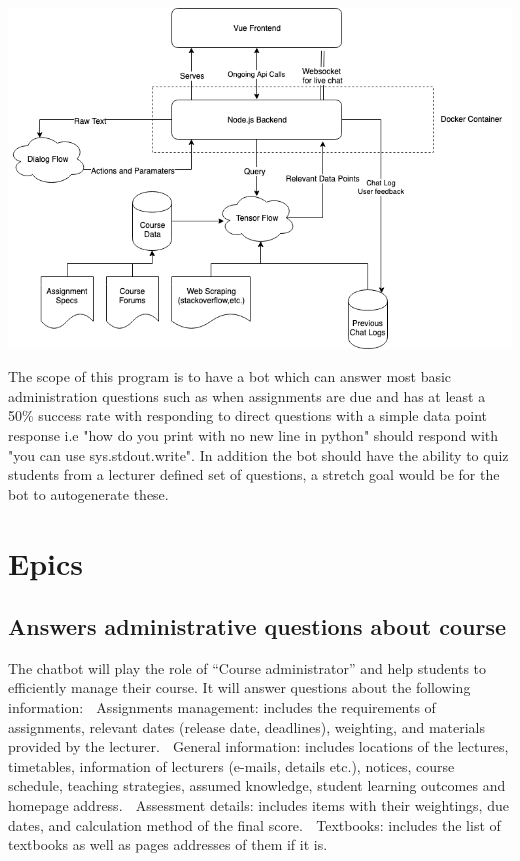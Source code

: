 \documentclass{article}
\begin{document}
\includegraphics[width=\textwidth]{architecture_diagram.png}

The scope of this program is to have a bot which can answer most basic administration questions such as when assignments are due and has at least a 50\% success rate with responding to direct questions with a simple data point response i.e 
"how do you print with no new line in python" should respond with "you can use sys.stdout.write". In addition the bot should have the ability to quiz students from a lecturer defined set of questions, a stretch goal would be for the bot to autogenerate these.

\section{Epics}
\subsection{Answers administrative questions about course}
The chatbot will play the role of “Course administrator” and help students to efficiently manage their course. It will answer questions about the following information:
	Assignments management: includes the requirements of assignments, relevant dates (release date, deadlines), weighting, and materials provided by the lecturer.
	General information: includes locations of the lectures, timetables, information of lecturers (e-mails, details etc.), notices, course schedule, teaching strategies, assumed knowledge, student learning outcomes and homepage address.
	Assessment details: includes items with their weightings, due dates, and calculation method of the final score.
	Textbooks: includes the list of textbooks as well as pages addresses of them if it is.
\end{document}
